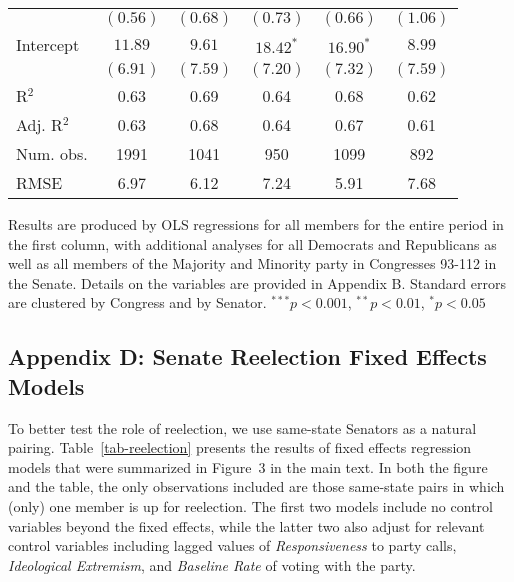 \documentclass[12pt]{article}
\begin{document}
\begin{table}[H]
\begin{threeparttable}
\begin{tabular}{l c c c c c }
                      & $(0.56)$      & $(0.68)$     & $(0.73)$       & $(0.66)$     & $(1.06)$     \\
Intercept             & $11.89$       & $9.61$       & $18.42^{*}$    & $16.90^{*}$  & $8.99$       \\
                      & $(6.91)$      & $(7.59)$     & $(7.20)$       & $(7.32)$     & $(7.59)$     \\
\hline
R$^2$                 & 0.63          & 0.69         & 0.64           & 0.68         & 0.62         \\
Adj. R$^2$            & 0.63          & 0.68         & 0.64           & 0.67         & 0.61         \\
Num. obs.             & 1991          & 1041         & 950            & 1099         & 892          \\
RMSE                  & 6.97          & 6.12         & 7.24           & 5.91         & 7.68         \\
\hline
\end{tabular}
\begin{tablenotes}
   \item
   Results are produced by OLS regressions for all members for the entire period
   in the first column, with additional analyses for all Democrats and
   Republicans as well as all members of the Majority and Minority party in
   Congresses 93-112 in the Senate.
   Details on the variables are provided in Appendix B.
   Standard errors are clustered by Congress and by Senator.
$^{***}p<0.001$, $^{**}p<0.01$, $^*p<0.05$
 \end{tablenotes}
\end{threeparttable}
\end{table}


\subsection*{Appendix D: Senate Reelection Fixed Effects Models}
%


To better test the role of reelection, we use same-state Senators as a natural
pairing.
Table~\ref{tab-reelection} presents the results of fixed effects regression
models that were summarized in Figure~3 in the main text.
In both the figure and the table, the only observations included are those
same-state pairs in which (only) one member is up for reelection.
The first two models include no control variables beyond the fixed effects,
while the latter two also adjust for relevant control variables including
lagged values of \textit{Responsiveness} to party calls,
\textit{Ideological Extremism}, and \textit{Baseline Rate} of voting with the
party.
\end{document}
